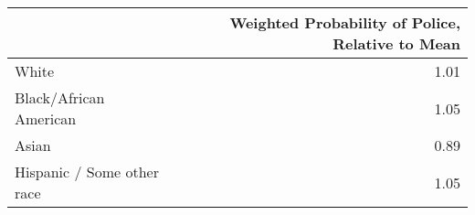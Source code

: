 \begin{tabular}{lr}
\toprule
{} &  Weighted Probability of Police, Relative to Mean \\
\midrule
White                      &                                              1.01 \\
Black/African American     &                                              1.05 \\
Asian                      &                                              0.89 \\
Hispanic / Some other race &                                              1.05 \\
\bottomrule
\end{tabular}
